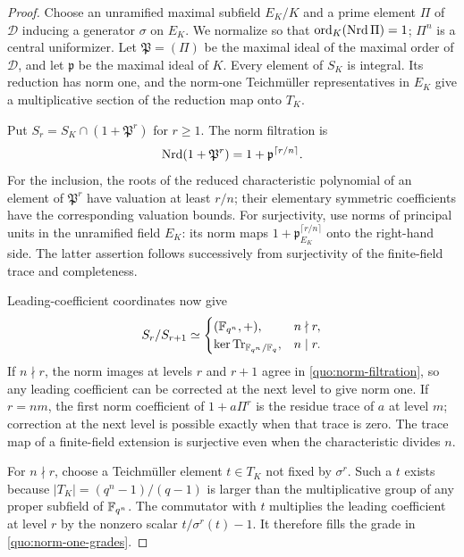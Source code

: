 \begin{proof}
Choose an unramified maximal subfield $E_K/K$ and a prime element
$\Pi$ of $\mathcal D$ inducing a generator $\sigma$ on $E_K$.
We normalize so that $\operatorname{ord}_K(\operatorname{Nrd}\Pi)=1$; $\Pi^n$ is a central
uniformizer.  Let $\mathfrak P=(\Pi)$ be the maximal ideal of the
maximal order of $\mathcal D$, and let $\mathfrak p$ be the maximal
ideal of $K$.  Every element of $S_K$ is integral.  Its reduction has
norm one, and the norm-one Teichm\"uller representatives in $E_K$
give a multiplicative section of the reduction map onto $T_K$.

Put $S_r=S_K\cap(1+\mathfrak P^r)$ for $r\geq1$.  The norm filtration
is
\begin{equation}\label{quo:norm-filtration}
 \operatorname{Nrd}(1+\mathfrak P^r)=1+\mathfrak p^{\lceil r/n\rceil}.
\end{equation}
For the inclusion, the roots of the reduced characteristic polynomial
of an element of $\mathfrak P^r$ have valuation at least $r/n$;
their elementary symmetric coefficients have the corresponding
valuation bounds.  For surjectivity, use norms of principal units in
the unramified field $E_K$: its norm maps
$1+\mathfrak p_{E_K}^{\lceil r/n\rceil}$ onto the right-hand side.
The latter assertion follows successively from surjectivity of the
finite-field trace and completeness.

Leading-coefficient coordinates now give
\begin{equation}\label{quo:norm-one-grades}
 S_r/S_{r+1}\simeq
 \begin{cases}
  (\mathbb F_{q^n},+),&n\nmid r,\\
  \ker\operatorname{Tr}_{\mathbb F_{q^n}/\mathbb F_q},&n\mid r.
 \end{cases}
\end{equation}
If $n\nmid r$, the norm images at levels $r$ and $r+1$ agree in
\eqref{quo:norm-filtration}, so any leading coefficient can be
corrected at the next level to give norm one.  If $r=nm$, the first
norm coefficient of $1+a\Pi^r$ is the residue trace of $a$ at
level $m$; correction at the next level is possible exactly when
that trace is zero.  The trace map of a finite-field extension is
surjective even when the characteristic divides $n$.

For $n\nmid r$, choose a Teichm\"uller element $t\in T_K$ not fixed
by $\sigma^r$.  Such a $t$ exists because
$|T_K|=(q^n-1)/(q-1)$ is larger than the multiplicative group of any
proper subfield of $\mathbb F_{q^n}$.  The commutator with $t$ multiplies
the leading coefficient at level $r$ by the nonzero scalar
$t/\sigma^r(t)-1$.  It therefore fills the grade in
\eqref{quo:norm-one-grades}.


\end{proof}
